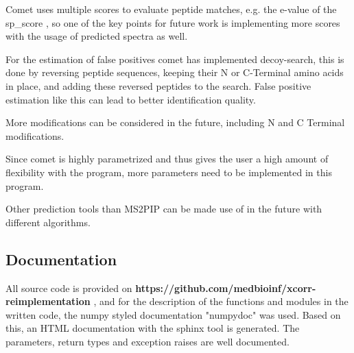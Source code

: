 \documentclass[11pt]{article}
\begin{document}
Comet uses multiple scores to evaluate peptide matches, e.g. the e-value of the sp\_score , so one of the key points for future work is implementing more scores with the usage of predicted spectra as well.

For the estimation of false positives comet has implemented decoy-search, this is done by reversing peptide sequences, keeping their N or C-Terminal amino acids in place, and adding these reversed peptides to the search. False positive estimation like this can lead to better identification quality.

More modifications can be considered in the future, including N and C Terminal modifications.

Since comet is highly parametrized and thus gives the user a high amount of flexibility with the program, more parameters need to be implemented in this program.

Other prediction tools than MS2PIP can be made use of in the future with different algorithms.

\subsection{Documentation}
All source code is provided on \textbf{https://github.com/medbioinf/xcorr-reimplementation} , and for the description of the functions and modules in the written code, the numpy styled documentation "numpydoc" was used. Based on this, an HTML documentation with the sphinx tool is generated. The parameters, return types and exception raises are well documented.

\newpage

\printbibliography
\end{document}

